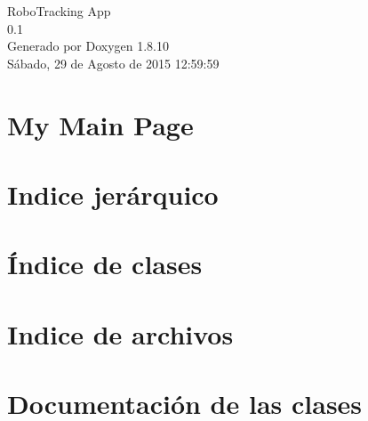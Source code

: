 \documentclass[twoside]{book}
\newcommand{\+}{\discretionary{\mbox{\scriptsize$\hookleftarrow$}}{}{}}
\newcommand{\clearemptydoublepage}{%
  \newpage{\pagestyle{empty}\cleardoublepage}%
}
\begin{document}
\hypersetup{pageanchor=false,
             bookmarks=true,
             bookmarksnumbered=true,
             pdfencoding=unicode
            }
\begin{titlepage}
\vspace*{7cm}
\begin{center}%
{\Large Robo\+Tracking App \\[1ex]\large 0.\+1 }\\
\vspace*{1cm}
{\large Generado por Doxygen 1.8.10}\\
\vspace*{0.5cm}
{\small Sábado, 29 de Agosto de 2015 12:59:59}\\
\end{center}
\end{titlepage}
\clearemptydoublepage
\tableofcontents
\clearemptydoublepage
{}
\hypersetup{pageanchor=true}

\chapter{My Main Page}
\label{index}\hypertarget{index}{}
\chapter{Indice jerárquico}

\chapter{Índice de clases}

\chapter{Indice de archivos}

\chapter{Documentación de las clases}






















\end{document}
